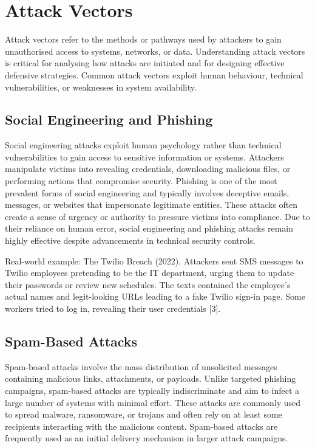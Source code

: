 \section{Attack Vectors}

Attack vectors refer to the methods or pathways used by attackers to gain unauthorised access to systems, networks, or data. Understanding attack vectors is critical for analysing how attacks are initiated and for designing effective defensive strategies. Common attack vectors exploit human behaviour, technical vulnerabilities, or weaknesses in system availability.

\subsection{Social Engineering and Phishing}

Social engineering attacks exploit human psychology rather than technical vulnerabilities to gain access to sensitive information or systems. Attackers manipulate victims into revealing credentials, downloading malicious files, or performing actions that compromise security. Phishing is one of the most prevalent forms of social engineering and typically involves deceptive emails, messages, or websites that impersonate legitimate entities. These attacks often create a sense of urgency or authority to pressure victims into compliance. Due to their reliance on human error, social engineering and phishing attacks remain highly effective despite advancements in technical security controls.

Real-world example: The Twilio Breach (2022). Attackers sent SMS messages to Twilio employees pretending to be the IT department, urging them to update their passwords or review new schedules. The texts contained the employee's actual names and legit-looking URLs leading to a fake Twilio sign-in page. Some workers tried to log in, revealing their user credentials [3].

\subsection{Spam-Based Attacks}

Spam-based attacks involve the mass distribution of unsolicited messages containing malicious links, attachments, or payloads. Unlike targeted phishing campaigns, spam-based attacks are typically indiscriminate and aim to infect a large number of systems with minimal effort. These attacks are commonly used to spread malware, ransomware, or trojans and often rely on at least some recipients interacting with the malicious content. Spam-based attacks are frequently used as an initial delivery mechanism in larger attack campaigns.

